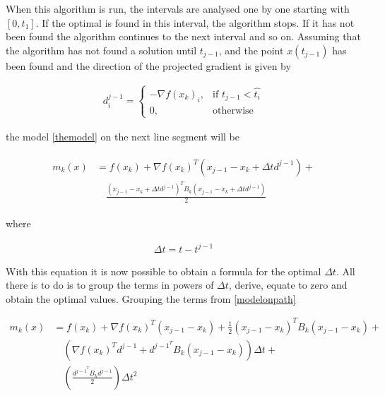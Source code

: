 When this algorithm is run, the intervals are analysed one by one starting with $[0, t_1]$.  If the optimal is found in this interval, the algorithm stops.  If it has not been found the algorithm continues to the next interval and so on.  Assuming that the algorithm has not found a solution until $t_{j-1}$, and the point $x(t_{j-1})$ has been found and the direction of the projected gradient is given by

\begin{equation}
  \begin{aligned}
    d_i^{j-1} = 
    \begin{cases}
      -\nabla f(x_k)_i, & \text{if } t_{j-1} < \hat{t_i} \\
      0, & \text{otherwise}
    \end{cases}
  \end{aligned}
\end{equation}

the model \ref{themodel} on the next line segment will be

\begin{equation} \label{modelonpath}
  \begin{aligned}
    \begin{split}
    m_k(x) & = f(x_k) + \nabla f(x_k)^T ( x_{j-1} - x_k + \Delta t d^{j-1}) + \\
     & \quad \frac{( x_{j-1} - x_k + \Delta t d^{j-1})^T B_k ( x_{j-1} - x_k + \Delta t d^{j-1})}{2}
    \end{split}
  \end{aligned}
\end{equation}

where

\begin{equation*}
  \begin{aligned}
    \Delta t = t - t^{j-1}
  \end{aligned}
\end{equation*}

With this equation it is now possible to obtain a formula for the optimal $\Delta t$.  All there is to do is to group the terms in powers of $\Delta t$, derive, equate to zero and obtain the optimal values. Grouping the terms from \ref{modelonpath}

\begin{equation} \label{cauchyterms}
  \begin{aligned}
    m_k(x) & = f(x_k) + \nabla f(x_k)^T ( x_{j-1} - x_k) + 
    \frac{1}{2} ( x_{j-1} - x_k)^T B_k ( x_{j-1} - x_k) + \\
    & \quad \left( \nabla f(x_k)^T d^{j-1} + d^{{j-1}^T} B_k (x_{j-1} - x_k) 
    \right) \Delta t + \\
    & \quad \left( \frac{d^{{j-1}^T} B_k d^{j-1}}{2} \right) \Delta t^2
  \end{aligned}
\end{equation}

